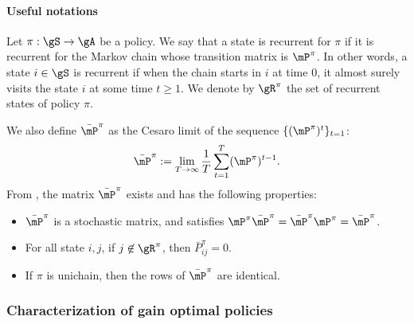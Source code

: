 \paragraph*{Useful notations}

Let $\pi:\gS\to\gA$ be a policy. We say that a state is recurrent for $\pi$ if it is recurrent for the Markov chain whose transition matrix is $\mP^\pi$. In other words, a state $i\in\gS$ is recurrent if when the chain starts in $i$ at time $0$, it almost surely visits the state $i$ at some time $t\ge1$.  We denote by $\gR^\pi$ the set of recurrent states of policy $\pi$. 

We also define $\bar{\mP}^\pi$ as the Cesaro limit of the sequence $\{(\mP^\pi)^t\}_{t=1}$:
\begin{align*}
    \bar{\mP}^\pi:=\lim_{T\to\infty}\frac1T\sum_{t=1}^T(\mP^\pi)^{t-1}.
\end{align*}
From \cite[Section~A.4 of Appendix~A]{puterman2014markov}, the matrix  $\bar{\mP}^\pi$ exists and has the following properties:
\begin{itemize}
    \item $\bar{\mP}^\pi$ is a stochastic matrix, and satisfies $\mP^\pi \bar{\mP}^\pi = \bar{\mP}^\pi\mP^\pi =\bar{\mP}^\pi$.
    \item For all state $i,j$, if $j\not\in\gR^\pi$, then $\bar{P}^\pi_{ij}=0$.
    \item If $\pi$ is unichain, then the rows of $\bar{\mP}^\pi$ are identical. 
\end{itemize}

\subsubsection{Characterization of gain optimal policies}

